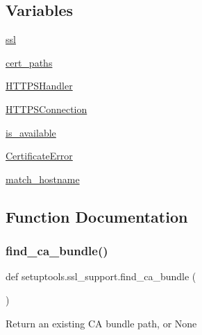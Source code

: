 \subsection*{Variables}
\begin{DoxyCompactItemize}
\item 
\hyperlink{namespacesetuptools_1_1ssl__support_a55a27a1705e0f1696f44078a212ed844}{ssl}
\item 
\hyperlink{namespacesetuptools_1_1ssl__support_a3bdfb81c9e24634ab57211cd72a90e0a}{cert\+\_\+paths}
\item 
\hyperlink{namespacesetuptools_1_1ssl__support_af7187d08f1ac5df0ac0382808f2a47d5}{H\+T\+T\+P\+S\+Handler}
\item 
\hyperlink{namespacesetuptools_1_1ssl__support_a2080acb14b60edc35201cff1915da4f8}{H\+T\+T\+P\+S\+Connection}
\item 
\hyperlink{namespacesetuptools_1_1ssl__support_a64bb9b0c9a63f24544b55c1d91312464}{is\+\_\+available}
\item 
\hyperlink{namespacesetuptools_1_1ssl__support_ac1a38bae98615d399c0145a6efb165e5}{Certificate\+Error}
\item 
\hyperlink{namespacesetuptools_1_1ssl__support_a8a8e98ff0935d8cda04e2f19fd235bc2}{match\+\_\+hostname}
\end{DoxyCompactItemize}


\subsection{Function Documentation}
\mbox{\label{namespacesetuptools_1_1ssl__support_a52d0214adb152f4c38aebc413e404278}} 
\subsubsection{\texorpdfstring{find\+\_\+ca\+\_\+bundle()}{find\_ca\_bundle()}}
{\footnotesize\ttfamily def setuptools.\+ssl\+\_\+support.\+find\+\_\+ca\+\_\+bundle (\begin{DoxyParamCaption}{ }\end{DoxyParamCaption})}

\begin{DoxyVerb}Return an existing CA bundle path, or None\end{DoxyVerb}
 \mbox{\label{namespacesetuptools_1_1ssl__support_a057bf5d0a699f8fba4f40ac7c339185d}} 
